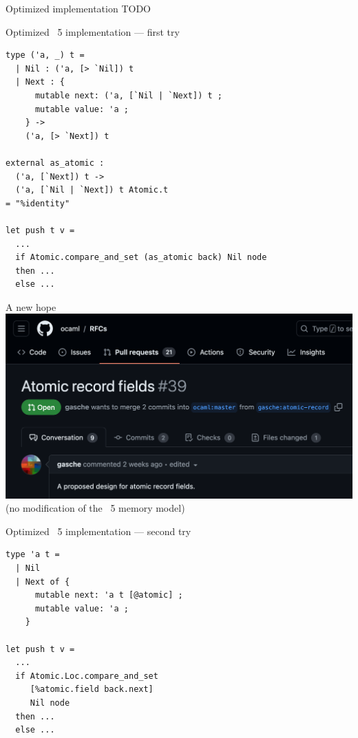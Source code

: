 
\begin{frame}{Optimized implementation}
TODO
\end{frame}


\begin{frame}[fragile]{Optimized \OCaml~5 implementation --- first try}
\small
\begin{verbatim}
type ('a, _) t =
  | Nil : ('a, [> `Nil]) t
  | Next : {
      mutable next: ('a, [`Nil | `Next]) t ;
      mutable value: 'a ;
    } -> 
    ('a, [> `Next]) t

external as_atomic :
  ('a, [`Next]) t ->
  ('a, [`Nil | `Next]) t Atomic.t
= "%identity"

let push t v =
  ...
  if Atomic.compare_and_set (as_atomic back) Nil node
  then ...
  else ...
\end{verbatim}
\end{frame}


\begin{frame}{A new hope}
\centering
\includegraphics[scale=0.35]{images/rfc.png}
\vfill
(no modification of the \OCaml~5 memory model)
\end{frame}


\begin{frame}[fragile]{Optimized \OCaml~5 implementation --- second try}
\begin{verbatim}
type 'a t =
  | Nil
  | Next of {
      mutable next: 'a t [@atomic] ;
      mutable value: 'a ;
    }

let push t v =
  ...
  if Atomic.Loc.compare_and_set
     [%atomic.field back.next]
     Nil node
  then ...
  else ...
\end{verbatim}
\end{frame}

